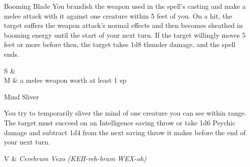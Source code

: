 

\pagestyle{empty}

\begin{Spell}[
  level={Cantrip},
  time={1 Action},
  range={Self/5 ft.},
  components={S, M},
  duration={1 Round},
  school={Evocation},
  attack={Melee},
  effect={Thunder}
]{Booming Blade}
You brandish the weapon used in the spell's casting and make a melee attack with it against one creature within 5 feet of you. On a hit, the target suffers the weapon attack's normal effects and then becomes sheathed in booming energy until the start of your next turn. If the target willingly moves 5 feet or more before then, the target takes 1d8 thunder damage, and the spell ends.

\begin{components}
S & \\
M & a melee weapon worth at least 1 sp
\end{components}
\end{Spell}


\begin{Spell}[
  level={Cantrip},
  time={1 Action},
  range={60 ft.},
  components={V},
  duration={1 Round},
  school={Enchantment},
  attack={INT 13},
  effect={1d6 Psychic}
]{Mind Sliver}

You try to temporarily sliver the mind of one creature you can see within range. The target must succeed on an Intelligence saving throw or take 1d6 Psychic damage and subtract 1d4 from the next saving throw it makes before the end of your next turn.

\begin{components}
V & \textit{Cerebrum Vexo (KEH-reh-brum WEX-oh)}
\end{components}
\end{Spell}


